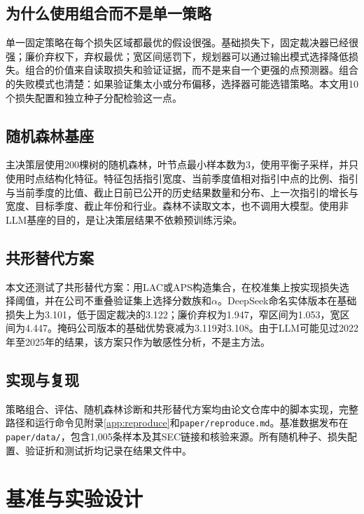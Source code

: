 \documentclass[12pt,openany]{ctexbook}
\begin{document}
\section{为什么使用组合而不是单一策略}
单一固定策略在每个损失区域都最优的假设很强。基础损失下，固定裁决器已经很强；廉价弃权下，弃权最优；宽区间惩罚下，规划器可以通过输出模式选择降低损失。组合的价值来自读取损失和验证证据，而不是来自一个更强的点预测器。组合的失败模式也清楚：如果验证集太小或分布偏移，选择器可能选错策略。本文用10个损失配置和独立种子分配检验这一点。\par

\section{随机森林基座}
主决策层使用200棵树的随机森林，叶节点最小样本数为3，使用平衡子采样，并只使用时点结构化特征。特征包括指引宽度、当前季度值相对指引中点的比例、指引与当前季度的比值、截止日前已公开的历史结果数量和分布、上一次指引的增长与宽度、目标季度、截止年份和行业。森林不读取文本，也不调用大模型。使用非LLM基座的目的，是让决策层结果不依赖预训练污染。\par

\section{共形替代方案}
本文还测试了共形替代方案：用LAC或APS构造集合，在校准集上按实现损失选择阈值，并在公司不重叠验证集上选择分数族和$\alpha$。DeepSeek命名实体版本在基础损失上为3.101，低于固定裁决的3.122；廉价弃权为1.947，窄区间为1.053，宽区间为4.447。掩码公司版本的基础优势衰减为3.119对3.108。由于LLM可能见过2022年至2025年的结果，该方案只作为敏感性分析，不是主方法。\par

\section{实现与复现}
策略组合、评估、随机森林诊断和共形替代方案均由论文仓库中的脚本实现，完整路径和运行命令见附录\ref{app:reproduce}和\texttt{paper/reproduce.md}。基准数据发布在\texttt{paper/data/}，包含1,005条样本及其SEC链接和核验来源。所有随机种子、损失配置、验证折和测试折均记录在结果文件中。\par

\chapter{基准与实验设计}
\label{ch:benchmark}
\end{document}
